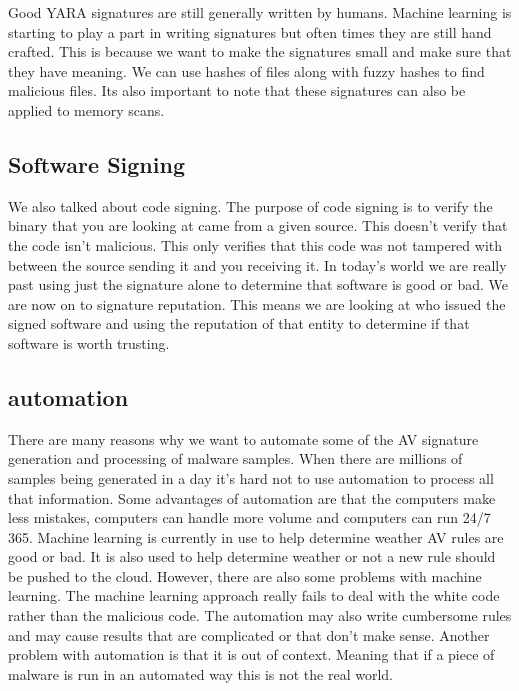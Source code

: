 \documentclass[letterpaper, onecolumn,10pt]{IEEEtran}
\begin{document}
            Good YARA signatures are still generally written by humans. Machine learning is starting to play a part in writing signatures but often times they are still hand crafted. This is because we want to make the signatures small and make sure that they have meaning. We can use hashes of files along with fuzzy hashes to find malicious files. Its also important to note that these signatures can also be applied to memory scans.\\
            
            \subsection{Software Signing}
            We also talked about code signing. The purpose of code signing is to verify the binary that you are looking at came from a given source. This doesn't verify that the code isn't malicious. This only verifies that this code was not tampered with between the source sending it and you receiving it. In today's world we are really past using just the signature alone to determine that software is good or bad. We are now on to signature reputation. This means we are looking at who issued the signed software and using the reputation of that entity to determine if that software is worth trusting.\\
            
            \subsection{automation}
            There are many reasons why we want to automate some of the AV signature generation and processing of malware samples. When there are millions of samples being generated in a day it's hard not to use automation to process all that information. Some advantages of automation are that the computers make less mistakes, computers can handle more volume and computers can run 24/7 365. Machine learning is currently in use to help determine weather AV rules are good or bad. It is also used to help determine weather or not a new rule should be pushed to the cloud. However, there are also some problems with machine learning. The machine learning approach really fails to deal with the white code rather than the malicious code. The automation may also write cumbersome rules and may cause results that are complicated or that don't make sense. Another problem with automation is that it is out of context. Meaning that if a piece of malware is run in an automated way this is not the real world.\\
            
\end{document}
